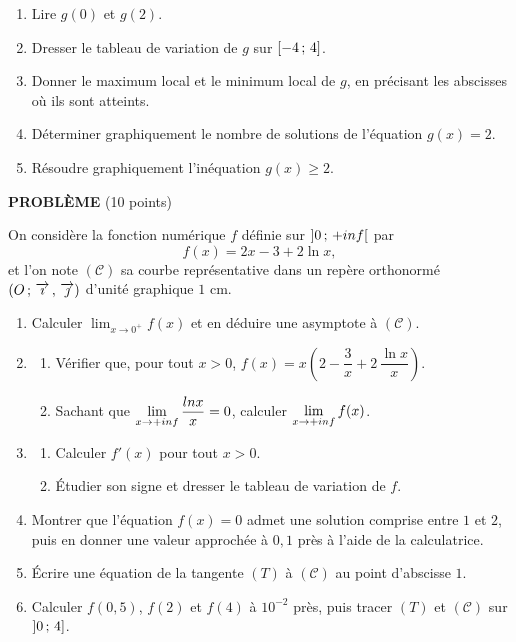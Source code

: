 \begin{devoirsurveille}
\begin{enumerate}[label=\textbf{\arabic*.}, leftmargin=*, itemsep=0.25em]
  \item Lire $g(0)$ et $g(2)$. 
  \item Dresser le tableau de variation de $g$ sur $\left[-4\,;\,4\right]$.
  \item Donner le maximum local et le minimum local de $g$, en précisant les
        abscisses où ils sont atteints. 
  \item Déterminer graphiquement le nombre de solutions de l'équation
        $g(x) = 2$. 
  \item Résoudre graphiquement l'inéquation $g(x) \geq 2$. 
\end{enumerate}

\vspace{0.7em}
\noindent\textbf{\sffamily PROBLÈME} \hfill \textup{(10 points)}

On considère la fonction numérique $f$ définie sur
$\left]0\,;\,+inf\right[$ par
\[
  f(x) = 2x-3+2\ln x ,
\]
et l'on note $(\mathcal C)$ sa courbe représentative dans un repère
orthonormé $\left(O\,;\,\overrightarrow{\imath}\,,\,\overrightarrow{\jmath}\right)$ d'unité graphique $1$ cm.

\begin{enumerate}[label=\textbf{\arabic*.}, leftmargin=*, itemsep=0.25em]
  \item Calculer $\displaystyle\lim_{x \to 0^{+}} f(x)$ et en déduire une
        asymptote à $(\mathcal C)$. 
  \item \begin{enumerate}[label=\textbf{\alph*)}, leftmargin=1.4em, itemsep=0.15em]
      \item Vérifier que, pour tout $x>0$,
            $f(x) = x\left(2-\dfrac3x+2\,\dfrac{\ln x}{x}\right)$.
      \item Sachant que $\limpinf \dfrac{\ln x}{x} = 0$, calculer
            $\limpinf f(x)$. 
    \end{enumerate}
  \item \begin{enumerate}[label=\textbf{\alph*)}, leftmargin=1.4em, itemsep=0.15em]
      \item Calculer $f'(x)$ pour tout $x>0$. 
      \item Étudier son signe et dresser le tableau de variation de $f$.
    \end{enumerate}
  \item Montrer que l'équation $f(x) = 0$ admet une solution comprise entre
        $1$ et $2$, puis en donner une valeur approchée à $0{,}1$ près à
        l'aide de la calculatrice. 
  \item Écrire une équation de la tangente $(T)$ à $(\mathcal C)$ au point
        d'abscisse $1$. 
  \item Calculer $f(0{,}5)$, $f(2)$ et $f(4)$ à $10^{-2}$ près, puis tracer
        $(T)$ et $(\mathcal C)$ sur $\left]0\,;\,4\right]$. 
\end{enumerate}


\end{devoirsurveille}

